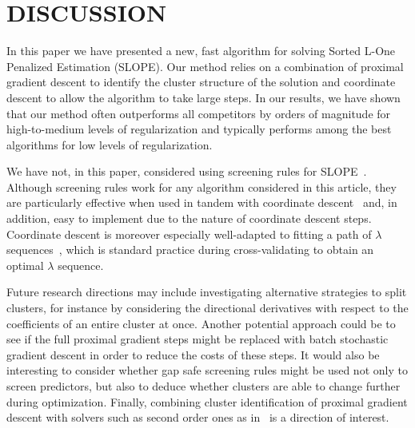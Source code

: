 \section{DISCUSSION}\label{sec:discussion}

In this paper we have presented a new, fast algorithm for solving Sorted L-One Penalized Estimation (SLOPE).
Our method relies on a combination of proximal gradient descent to identify the cluster structure of the solution and coordinate descent to allow the algorithm to take large steps.
In our results, we have shown that our method often outperforms all competitors by orders of magnitude for high-to-medium levels of regularization and typically performs among the best algorithms for low levels of regularization.

We have not, in this paper, considered using screening rules for SLOPE~\parencite{larsson2020c,elvira2022}.
Although screening rules work for any algorithm considered in this article, they are particularly effective when used in tandem with coordinate descent~\parencite{fercoq2015} and, in addition, easy to implement due to the nature of coordinate descent steps.
Coordinate descent is moreover especially well-adapted to fitting a path of \(\lambda\) sequences~\parencite{friedman2007,friedman2010}, which is standard practice during cross-validating to obtain an optimal \(\lambda\) sequence.

Future research directions may include investigating alternative strategies to split clusters, for instance by considering the directional derivatives with respect to the coefficients of an entire cluster at once.
Another potential approach could be to see if the full proximal gradient steps might be replaced with batch stochastic gradient descent in order to reduce the costs of these steps.
It would also be interesting to consider whether gap safe screening rules might be used not only to screen predictors, but also to deduce whether clusters are able to change further during optimization.
Finally, combining cluster identification of proximal gradient descent with solvers such as second order ones as in~\textcite{bareilles2022newton} is a direction of interest.
